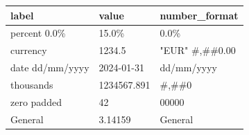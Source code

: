 \documentclass[11pt,a4paper]{article}
\begin{document}
\begin{table}[h]
\begin{tabular}{|l|l|l|}
\hline
label & value & number\_format \\ \hline
percent 0.0\% & 15.0\% & 0.0\% \\ \hline
currency & 1234.5 & "EUR" \#,\#\#0.00 \\ \hline
date dd/mm/yyyy & 2024-01-31 & dd/mm/yyyy \\ \hline
thousands & 1234567.891 & \#,\#\#0 \\ \hline
zero padded & 42 & 00000 \\ \hline
General & 3.14159 & General \\ \hline
\end{tabular}
\end{table}
\end{document}
